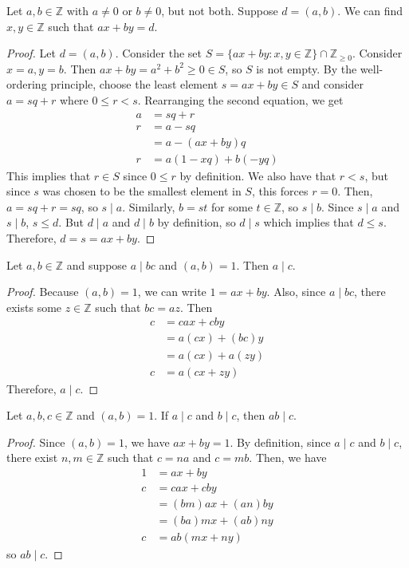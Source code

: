\documentclass [12pt] {article}
\newcommand{\Z}{\mathbb{Z}}
\newenvironment{theorem}[1]{\begin{tcolorbox}[title={Theorem #1},colback=green!5!white,colframe=black!75!green]}{\end{tcolorbox}}
\newenvironment{corollary}[1]{\begin{tcolorbox}[title={Corollary #1}]}{\end{tcolorbox}}
\begin{document}
\begin{theorem}{(Bezout's Identity)}
    Let $a, b \in \Z$ with $a \neq 0$ or $b \neq 0$, but not both. Suppose $d = (a, b)$. We can find
    $x, y \in \Z$ such that $ax + by = d$.
\end{theorem}
\begin{proof}
    Let $d = (a, b)$. Consider the set $S = \{ ax + by : x, y \in \Z\} \cap \Z_{\geq 0}$. Consider
    $x = a, y = b$. Then $ax + by = a^2 + b^2 \geq 0 \in S$, so $S$ is not empty. By the
    well-ordering principle, choose the least element $s = ax + by \in S$ and consider $a = sq + r$
    where $0 \leq r < s$. Rearranging the second equation, we get
    \begin{align*}
        a &= sq + r \\
        r &= a - sq \\
          &= a - (ax + by)q \\
        r &= a(1 - xq) + b(-yq)
    \end{align*}
    This implies that $r \in S$ since $0 \leq r$ by definition. We also have that $r < s$, but since
    $s$ was chosen to be the smallest element in $S$, this forces $r = 0$. Then, $a = sq + r = sq$,
    so $s \mid a$. Similarly, $b = st$ for some $t \in \Z$, so $s \mid b$. Since $s \mid a$ and $s \mid b$,  $s
    \leq d$. But $d \mid a$ and $d \mid b$ by definition, so $d \mid s$ which implies that $d \leq s$.
    Therefore, $d = s = ax + by$.
\end{proof}

\begin{theorem}{}
    Let $a, b \in \Z$ and suppose $a \mid bc$ and $(a, b) = 1$. Then $a \mid c$.
\end{theorem}
\begin{proof}
    Because $(a, b) = 1$, we can write $1 = ax + by$. Also, since $a \mid bc$, there exists some
    $z \in \Z$ such that $bc = az$. Then
    \begin{align*}
        c &= cax + cby \\
          &= a(cx) + (bc)y \\
          &= a(cx) + a(zy) \\
        c &= a(cx + zy)
    \end{align*}
    Therefore, $a \mid c$.
\end{proof}

\newpage
\begin{corollary}{}
    Let $a, b, c \in \Z$ and $(a, b) = 1$. If $a \mid c$ and $b \mid c$, then $ab \mid c$.
\end{corollary}
\begin{proof}
    Since $(a, b) = 1$, we have $ax + by = 1$. By definition, since $a \mid c$ and $b \mid c$, there exist
    $n, m \in \Z$ such that $c = na$ and $c = mb$. Then, we have
    \begin{align*}
        1 &= ax + by \\
        c &= cax + cby \\
          &= (bm)ax + (an)by \\
          &= (ba)mx + (ab)ny \\
        c &= ab(mx + ny)
    \end{align*}
    so $ab \mid c$.
\end{proof}
\end{document}
